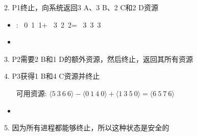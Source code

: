2. P1终止，向系统返回3 A、3 B、2 C和2 D资源
    \begin{itemize}
        \item {}: \ 0\ 1\ 1\rangle + \ 3\ 2\ 2\rangle = \ 3\ 3\ 3\rangle
        \item {}
    \end{itemize}

3. P2需要2 B和1 D的额外资源，然后终止，返回其所有资源

4. P3获得1 B和4 C资源并终止
    \begin{itemize}
        \item [可用资源: $\ 3\ 6\ 6\rangle - \ 1\ 4\ 0\rangle + \ 3\ 5\ 0\rangle = \ 5\ 7\ 6\rangle$]
        \item {}
    \end{itemize}

5. 因为所有进程都能够终止，所以这种状态是安全的
